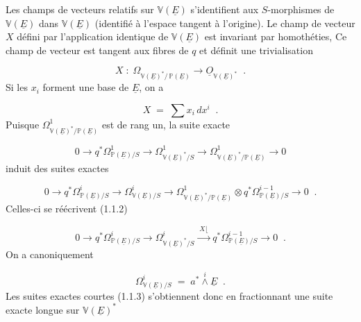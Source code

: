 Les champs de vecteurs relatifs sur $\mathbb{V}(\underline{E})$ s'identifient aux $S$-morphismes de $\mathbb{V}(\underline{E})$ dans $\mathbb{V}(\underline{E})$ (identifié à l'espace tangent à l'origine). Le champ de vecteur $X$ défini par l'application identique de $\mathbb{V}(\underline{E})$ est invariant par homothéties, Ce champ de vecteur est tangent aux fibres de $q$ et définit une trivialisation

\begin{equation}\tag{1.1.2}
X \;:\; \Omega_{\mathbb{V}(\underline{E})^*/\,\mathbb{P}(\underline{E})} \longrightarrow \underline{O}_{\mathbb{V}(\underline{E})^*} \;\; .
\end{equation}
Si les $x_i$ forment une base de $\underline{E}$, on a

\begin{equation*}
X \;=\; \sum x_i \, dx^i \;\; .
\end{equation*}
Puisque $\Omega^1_{\mathbb{V}(\underline{E})^*/\mathbb{P}(\underline{E})}$ est de rang un, la suite exacte

\begin{equation*}
0 \longrightarrow q^*\Omega^1_{\mathbb{P}(\underline{E})/S} \longrightarrow \Omega^1_{\mathbb{V}(\underline{E})^*/S} \longrightarrow \Omega^1_{\mathbb{V}(\underline{E})^*/\mathbb{P}(\underline{E})} \longrightarrow 0
\end{equation*}
induit des suites exactes

\begin{equation*}
0 \longrightarrow q^*\Omega^i_{\mathbb{P}(\underline{E})/S} \longrightarrow \Omega^i_{\mathbb{V}(\underline{E})/S} \longrightarrow \Omega^1_{\mathbb{V}(\underline{E})^*/\mathbb{P}(\underline{E})} \otimes q^*\Omega^{i-1}_{\mathbb{P}(\underline{E})/S} \longrightarrow 0 \;\; .
\end{equation*}
Celles-ci se réécrivent (1.1.2)

\begin{equation}\tag{1.1.3}
0 \longrightarrow q^*\Omega^i_{\mathbb{P}(\underline{E})/S} \longrightarrow \Omega^i_{\mathbb{V}(\underline{E})^*/S} \xrightarrow{\;X\lfloor\;} q^*\Omega^{i-1}_{\mathbb{P}(\underline{E})/S} \longrightarrow 0 \;\; .
\end{equation}
On a canoniquement

\begin{equation}\tag{1.1.4}
\Omega^i_{\mathbb{V}(\underline{E})/S} \;=\; a^* \overset{i}{\wedge} \underline{E} \;\; .
\end{equation}
Les suites exactes courtes (1.1.3) s'obtiennent donc en fractionnant une suite exacte longue sur $\mathbb{V}(\underline{E})^*$

